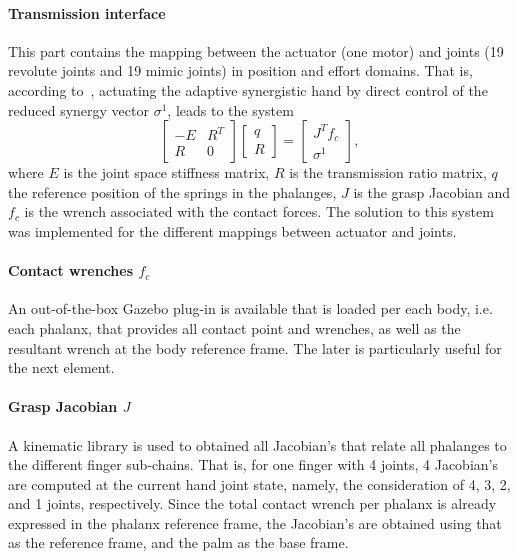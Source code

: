 \paragraph{Transmission interface} This part contains the mapping between the actuator (one motor) and joints (19 revolute joints and 19 mimic joints) in position and effort domains. That is, according to~\cite{Catalano2014Adaptive}, actuating the adaptive synergistic hand by direct control of the reduced synergy vector $\sigma^{1}$, leads to the system
\begin{equation}
\left[ \begin{array}{cc} -E & R^{T} \\ R & 0 \end{array} \right] \left[ \begin{array}{c} q \\ R  \end{array} \right] = \left[ \begin{array}{c} J^{T}f_{c} \\ \sigma^{1}  \end{array} \right],
\end{equation}
where $E$ is the joint space stiffness matrix, $R$ is the transmission ratio matrix, $q$ the reference position of the springs in the phalanges, $J$ is the grasp Jacobian and $f_c$ is the wrench associated with the contact forces. The solution to this system was implemented for the different mappings between actuator and joints.

\paragraph{Contact wrenches $f_c$} An out-of-the-box Gazebo plug-in is available that is loaded per each body, i.e. each phalanx, that provides all contact point and wrenches, as well as the resultant wrench at the body reference frame. The later is particularly useful for the next element.

\paragraph{Grasp Jacobian $J$} A kinematic library is used to obtained all Jacobian's that relate all phalanges to the different finger sub-chains. That is, for one finger with 4 joints, 4 Jacobian's are computed at the current hand joint state, namely, the consideration of 4, 3, 2, and 1 joints, respectively. Since the total contact wrench per phalanx is already expressed in the phalanx reference frame, the Jacobian's are obtained using that as the reference frame, and the palm as the base frame. 

